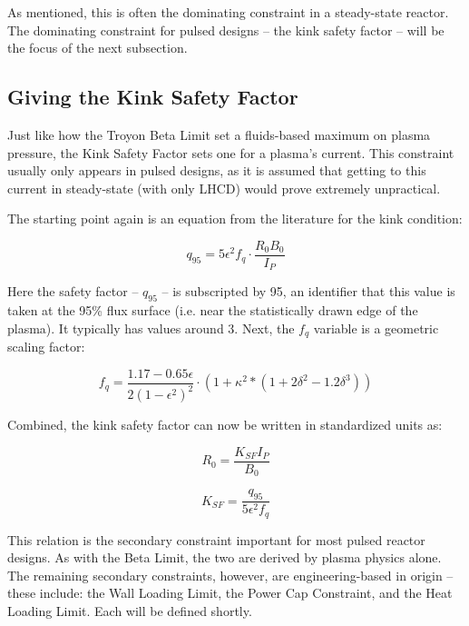 As mentioned, this is often the dominating constraint in a steady-state reactor. The dominating constraint for pulsed designs -- the kink safety factor -- will be the focus of the next subsection.

\subsection{Giving the Kink Safety Factor}

Just like how the Troyon Beta Limit set a fluids-based maximum on plasma pressure, the Kink Safety Factor sets one for a plasma's current. This constraint usually only appears in pulsed designs, as it is assumed that getting to this current in steady-state (with only LHCD) would prove extremely unpractical.

The starting point again is an equation from the literature for the kink condition:

\begin{equation}
	q_{95} = 5 \epsilon^2 f_q \cdot  \frac{ R_0 B_0 }{ I_P }
\end{equation}

Here the safety factor -- $q_{95}$ -- is subscripted by 95, an identifier that this value is taken at the 95\% flux surface (i.e. near the statistically drawn edge of the plasma). It typically has values around 3. Next, the $f_q$ variable is a geometric scaling factor:

\begin{equation}
  f_q = \frac{1.17 - 0.65 \epsilon}{2 ( 1 - \epsilon^2 )^2} \cdot  \left( 1 + \kappa^2 * ( 1 + 2 \delta^2 - 1.2 \delta^3 ) \right)
\end{equation}

Combined, the kink safety factor can now be written in standardized units as:

\begin{equation}
   R_0 = \frac{ K_{SF} I_P }{ B_0 }
\end{equation}

\begin{equation}
  K_{SF} = \frac{q_{95}}{5 \epsilon^2 f_q}
\end{equation}

This relation is the secondary constraint important for most pulsed reactor designs. As with the Beta Limit, the two are derived by plasma physics alone. The remaining secondary constraints, however, are engineering-based in origin -- these include: the Wall Loading Limit, the Power Cap Constraint, and the Heat Loading Limit. Each will be defined shortly.

